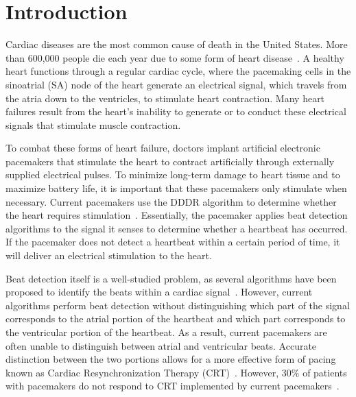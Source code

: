 \documentclass[conference]{IEEEtran}
\begin{document}




%
\IEEEpeerreviewmaketitle



\section{Introduction}
Cardiac diseases are the most common cause of death in
the United States. More than 600,000 people die each year
due to some form of heart disease~\cite{death-stats}. A healthy heart
functions through a regular cardiac cycle, where the pacemaking cells
in the sinoatrial (SA) node of the heart
generate an electrical signal, which travels from the atria
down to the ventricles, to stimulate heart contraction.
Many heart failures result from the heart's inability to
generate or to conduct these electrical signals
that stimulate muscle contraction. 

To combat these forms of heart failure, doctors implant artificial electronic pacemakers
that stimulate the heart
to contract artificially through externally supplied
electrical pulses.
To minimize long-term damage to heart tissue and to maximize battery life, it is important that these pacemakers only stimulate when necessary.
Current pacemakers use the 
DDDR algorithm to determine whether
the heart requires stimulation~\cite{basic-pacing}.
Essentially, the pacemaker applies beat detection algorithms to the signal it senses
to determine whether a
heartbeat has occurred. If the pacemaker does not detect a heartbeat
within a certain period of time, it will deliver an
electrical stimulation to the heart.

Beat detection itself is a well-studied problem, as
several algorithms have been proposed to identify the
beats within a cardiac signal~\cite{realtime-qrs, ecg-filter}. However, current
algorithms perform beat detection without distinguishing
which part of the signal corresponds to the atrial
portion of the heartbeat and which part corresponds to 
the ventricular portion of the heartbeat. As a result,
current pacemakers are often unable to distinguish
between atrial and ventricular beats.
Accurate distinction between the two portions allows for a more effective form of pacing known as
Cardiac Resynchronization Therapy (CRT)~\cite{multisite-crt}.
However,  30\% of patients with pacemakers do 
not respond to CRT implemented by current pacemakers~\cite{multisite-crt}. 
\end{document}
